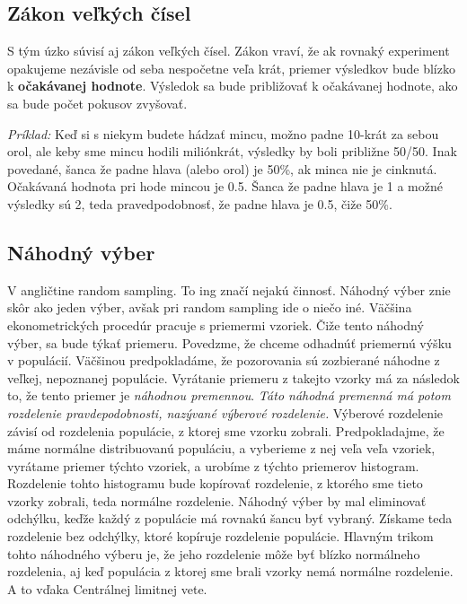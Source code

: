 \hypertarget{zuxe1kon-veux13ekuxfdch-ux10duxedsel}{%
\subsection{Zákon veľkých
čísel}\label{zuxe1kon-veux13ekuxfdch-ux10duxedsel}}

S tým úzko súvisí aj zákon veľkých čísel. Zákon vraví, že ak rovnaký
experiment opakujeme nezávisle od seba nespočetne veľa krát, priemer
výsledkov bude blízko k \textbf{očakávanej hodnote}. Výsledok sa bude
približovať k očakávanej hodnote, ako sa bude počet pokusov zvyšovať.

\emph{Príklad:} Keď si s niekym budete hádzať mincu, možno padne 10-krát
za sebou orol, ale keby sme mincu hodili miliónkrát, výsledky by boli
približne 50/50. Inak povedané, šanca že padne hlava (alebo orol) je
50\%, ak minca nie je cinknutá. Očakávaná hodnota pri hode mincou je
0.5. Šanca že padne hlava je 1 a možné výsledky sú 2, teda
pravedpodobnosť, že padne hlava je 0.5, čiže 50\%.

\hypertarget{nuxe1hodnuxfd-vuxfdber}{%
\subsection{Náhodný výber}\label{nuxe1hodnuxfd-vuxfdber}}

V angličtine random sampling. To ing značí nejakú činnosť. Náhodný výber
znie skôr ako jeden výber, avšak pri random sampling ide o niečo iné.
Väčšina ekonometrických procedúr pracuje s priemermi vzoriek. Čiže tento
náhodný výber, sa bude týkať priemeru. Povedzme, že chceme odhadnúť
priemernú výšku v populácií. Väčšinou predpokladáme, že pozorovania sú
zozbierané náhodne z veľkej, nepoznanej populácie. Vyrátanie priemeru z
takejto vzorky má za následok to, že tento priemer je \emph{náhodnou
premennou}. \emph{Táto náhodná premenná má potom rozdelenie
pravdepodobnosti, nazývané výberové rozdelenie.} Výberové rozdelenie
závisí od rozdelenia populácie, z ktorej sme vzorku zobrali.
Predpokladajme, že máme normálne distribuovanú populáciu, a vyberieme z
nej veľa veľa vzoriek, vyrátame priemer týchto vzoriek, a urobíme z
týchto priemerov histogram. Rozdelenie tohto histogramu bude kopírovať
rozdelenie, z ktorého sme tieto vzorky zobrali, teda normálne
rozdelenie. Náhodný výber by mal eliminovať odchýlku, keďže každý z
populácie má rovnakú šancu byť vybraný. Získame teda rozdelenie bez
odchýlky, ktoré kopíruje rozdelenie populácie. Hlavným trikom tohto
náhodného výberu je, že jeho rozdelenie môže byť blízko normálneho
rozdelenia, aj keď populácia z ktorej sme brali vzorky nemá normálne
rozdelenie. A to vďaka Centrálnej limitnej vete.


